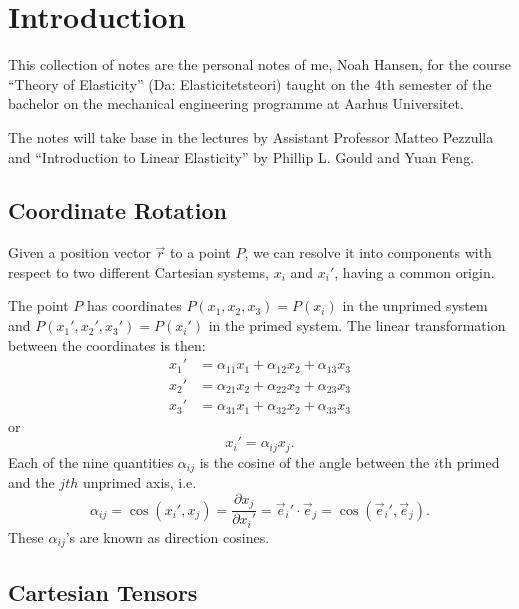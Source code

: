 
\section{Introduction}

This collection of notes are the personal notes of me, Noah Hansen, for the course ``Theory of Elasticity'' (Da: Elasticitetsteori) taught on the 4th semester of the bachelor on the mechanical engineering programme at Aarhus Universitet.

The notes will take base in the lectures by Assistant Professor Matteo Pezzulla and ``Introduction to Linear Elasticity'' by Phillip L. Gould and Yuan Feng.

\subsection{Coordinate Rotation}

Given a position vector $\Vec{r}$ to a point $P$, we can resolve it into components with respect to two different Cartesian systems, $x_i$ and $x_i'$, having a common origin.

The point $P$ has coordinates $P(x_1, x_2, x_3) = P(x_i)$ in the unprimed system and $P(x_1', x_2', x_3') = P(x_i')$ in the primed system.
The linear transformation between the coordinates is then:
\begin{align*}
  x_1' &= \alpha_{11} x_1 + \alpha_{12} x_2 + \alpha_{13} x_3 \\
  x_2' &= \alpha_{21} x_2 + \alpha_{22} x_2 + \alpha_{23} x_3 \\
  x_3' &= \alpha_{31} x_1 + \alpha_{32} x_2 + \alpha_{33} x_3
\end{align*}
or
\begin{equation*}
  x_i' = \alpha_{ij} x_j
.\end{equation*}
Each of the nine quantities $\alpha_{ij}$ is the cosine of the angle between the $i$th primed and the $jth$ unprimed axis, i.e.
\begin{equation*}
  \alpha_{ij} = \cos \left( x_i', x_j  \right) = \frac{\partial x_j}{\partial x_i'} = \Vec{e}_i' \cdot \Vec{e}_j = \cos \left( \Vec{e}_i', \Vec{e}_j \right)
.\end{equation*}
These $\alpha_{ij}$'s are known as direction cosines.


\subsection{Cartesian Tensors}


